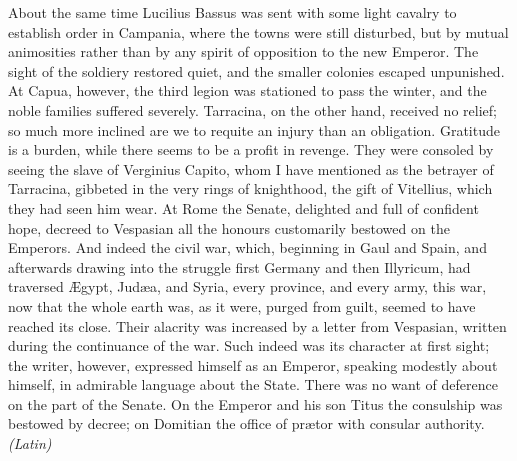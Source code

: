 About the same time Lucilius Bassus was sent with some light cavalry to establish order in Campania, where the towns were still disturbed, but by mutual animosities rather than by any spirit of opposition to the new Emperor. The sight of the soldiery restored quiet, and the smaller colonies escaped unpunished. At Capua, however, the third legion was stationed to pass the winter, and the noble families suffered severely. Tarracina, on the other hand, received no relief; so much more inclined are we to requite an injury than an obligation. Gratitude is a burden, while there seems to be a profit in revenge. They were consoled by seeing the slave of Verginius Capito, whom I have mentioned as the betrayer of Tarracina, gibbeted in the very rings of knighthood, the gift of Vitellius, which they had seen him wear. At Rome the Senate, delighted and full of confident hope, decreed to Vespasian all the honours customarily bestowed on the Emperors. And indeed the civil war, which, beginning in Gaul and Spain, and afterwards drawing into the struggle first Germany and then Illyricum, had traversed Ægypt, Judæa, and Syria, every province, and every army, this war, now that the whole earth was, as it were, purged from guilt, seemed to have reached its close. Their alacrity was increased by a letter from Vespasian, written during the continuance of the war. Such indeed was its character at first sight; the writer, however, expressed himself as an Emperor, speaking modestly about himself, in admirable language about the State. There was no want of deference on the part of the Senate. On the Emperor and his son Titus the consulship was bestowed by decree; on Domitian the office of prætor with consular authority. \emph{(Latin)}


